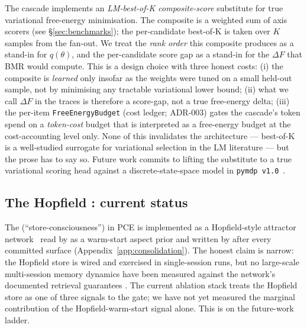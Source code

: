 The cascade implements an \emph{LM-best-of-K composite-score} substitute for true variational free-energy minimisation. The composite is a weighted sum of axis scorers (see \S\ref{sec:benchmarks}); the per-candidate best-of-K is taken over $K$ samples from the  fan-out. We treat the \emph{rank order} this composite produces as a stand-in for $q(\theta)$, and the per-candidate score gap as a stand-in for the $\Delta F$ that BMR would compute. This is a design choice with three honest costs: (i) the composite is \emph{learned} only insofar as the weights were tuned on a small held-out sample, not by minimising any tractable variational lower bound; (ii) what we call $\Delta F$ in the traces is therefore a score-gap, not a true free-energy delta; (iii) the per-item \texttt{FreeEnergyBudget} (cost ledger; ADR-003) gates the cascade's token spend on a \emph{token-cost} budget that is interpreted as a free-energy budget at the cost-accounting level only. None of this invalidates the architecture --- best-of-K is a well-studied surrogate for variational selection in the LM literature \citep{StiennonEtAl2020LearningToSummarizeFromHumanFeedback,MadaanEtAl2023SelfRefineNeurIPS} --- but the prose has to say so. Future work commits to lifting the substitute to a true variational scoring head against a discrete-state-space model in \texttt{pymdp v1.0}~\citep{Heins2022pymdp,pymdpRelease100}.

\subsection{The Hopfield : current status}

The  (``store-consciousness'') in PCE is implemented as a Hopfield-style attractor network~\citep{KrotovHopfield2016DenseAssociativeMemory,RamsauerEtAl2020HopfieldNetworksIsAllYouNeed,Mtenga2024HopfieldCreativity,Weber2025SelfOptHopfield} read by  as a warm-start aspect prior and written by  after every committed surface (Appendix~\ref{app:consolidation}). The honest claim is narrow: the Hopfield store is wired and exercised in single-session runs, but no large-scale multi-session memory dynamics have been measured against the network's documented retrieval guarantees \citep{RamsauerEtAl2020HopfieldNetworksIsAllYouNeed}. The current ablation stack treats the Hopfield store as one of three signals to the  gate; we have not yet measured the marginal contribution of the Hopfield-warm-start signal alone. This is on the future-work ladder.
